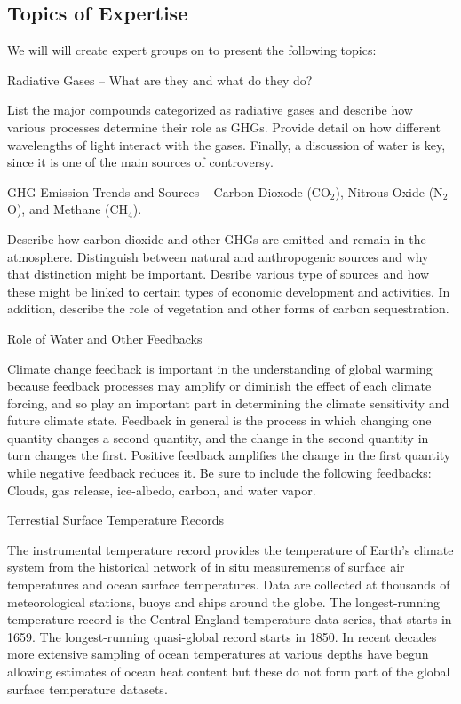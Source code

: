 \documentclass{article}\usepackage[]{graphicx}\usepackage[]{color}
\newenvironment{enumerate*}%
  {\begin{enumerate}%
    \setlength{\itemsep}{0pt}%
    \setlength{\parskip}{0pt}}%
  {\end{enumerate}}
\begin{document}
\subsection{Topics of Expertise}

We will will create expert groups on to present the following topics:

\begin{enumerate*}
  \item Radiative Gases -- What are they and what do they do?
  
List the major compounds categorized as radiative gases and describe how various processes determine their role as GHGs. Provide detail on how different wavelengths of light interact with the gases. Finally, a discussion of water is key, since it is one of the main sources of controversy. 
  
  \item GHG Emission Trends and Sources -- Carbon Dioxode (CO$_2$), Nitrous Oxide (N$_2$O), and Methane (CH$_4$).

Describe how carbon dioxide and other GHGs are emitted and remain in the atmosphere. Distinguish between natural and anthropogenic sources and why that distinction might be important. Desribe various type of sources and how these might be linked to certain types of economic development and activities. In addition, describe the role of vegetation and other forms of carbon sequestration.

  \item Role of Water and Other Feedbacks
  
Climate change feedback is important in the understanding of global warming because feedback processes may amplify or diminish the effect of each climate forcing, and so play an important part in determining the climate sensitivity and future climate state. Feedback in general is the process in which changing one quantity changes a second quantity, and the change in the second quantity in turn changes the first. Positive feedback amplifies the change in the first quantity while negative feedback reduces it. Be sure to include the following feedbacks: Clouds, gas release, ice-albedo, carbon, and water vapor.

  \item Terrestial Surface Temperature Records
  
The instrumental temperature record provides the temperature of Earth's climate system from the historical network of in situ measurements of surface air temperatures and ocean surface temperatures. Data are collected at thousands of meteorological stations, buoys and ships around the globe. The longest-running temperature record is the Central England temperature data series, that starts in 1659. The longest-running quasi-global record starts in 1850. In recent decades more extensive sampling of ocean temperatures at various depths have begun allowing estimates of ocean heat content but these do not form part of the global surface temperature datasets.
  

\end{enumerate*}
\end{document}

